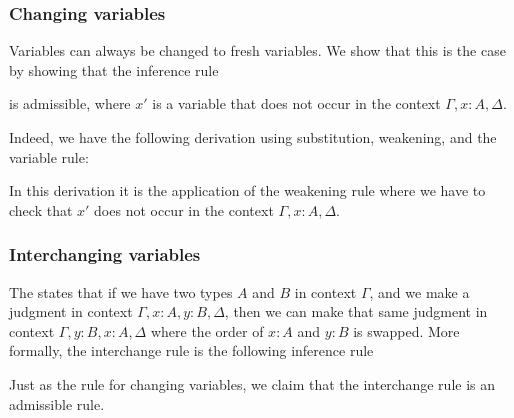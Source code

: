 \subsubsection*{Changing variables}

Variables can always be changed to fresh variables. We show that this is the case by showing that the inference rule
\begin{prooftree}
\end{prooftree}
is admissible, where $x'$ is a variable that does not occur in the context $\Gamma,x:A,\Delta$. 

Indeed, we have the following derivation using substitution, weakening, and the variable rule:
\begin{prooftree}
\end{prooftree}
In this derivation it is the application of the weakening rule where we have to check that $x'$ does not occur in the context $\Gamma,x:A,\Delta$.

\subsubsection*{Interchanging variables}

The  states that if we have two types $A$ and $B$ in context $\Gamma$, and we make a judgment in context $\Gamma,x:A,y:B,\Delta$, then we can make that same judgment in context $\Gamma,y:B,x:A,\Delta$ where the order of $x:A$ and $y:B$ is swapped. More formally, the interchange rule is the following inference rule
\begin{prooftree}
\end{prooftree}
Just as the rule for changing variables, we claim that the interchange rule is an admissible rule.

